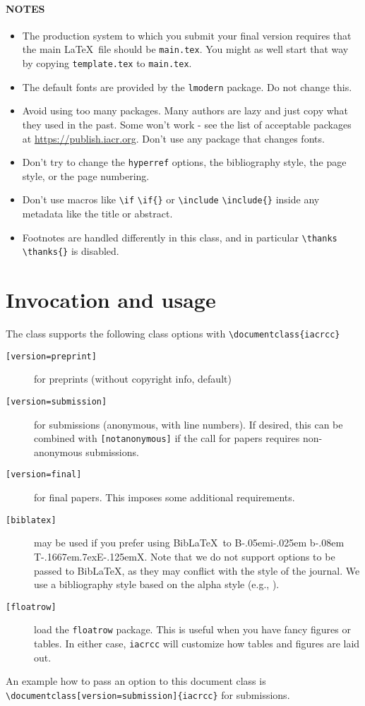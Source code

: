 \documentclass{iacrcc}
\newcommand{\cmd}[2][]{%
  \def\FirstArg{#1}
  \ifx\FirstArg\empty
    \texttt{\textbackslash{}#2}%
  \else
    \texttt{\textbackslash{}#2\{#1\}}%
  \fi
}
\def\BibTeX{{\rm B\kern-.05em{\sc i\kern-.025em b}\kern-.08em
    T\kern-.1667em\lower.7ex\hbox{E}\kern-.125emX}}
\def\BibLaTeX{Bib\LaTeX}
\begin{document}
\paragraph*{NOTES}
\begin{itemize}
\item The production system to which you submit your final version requires
  that the main \LaTeX\ file should be \texttt{main.tex}. You might as
  well start that way by copying \texttt{template.tex} to \texttt{main.tex}.
\item The default fonts are provided by the \verb+lmodern+ package. Do not
  change this.
\item Avoid using too many packages. Many authors are lazy and just
  copy what they used in the past. Some won't work - see the list of
  acceptable packages at \url{https://publish.iacr.org}. Don't use any
  package that changes fonts.
\item Don't try to change the \texttt{hyperref} options, the bibliography style,
  the page style, or the page numbering.
\item Don't use macros like \cmd{if} or \cmd{include} inside any
  metadata like the title or abstract.
\item Footnotes are handled differently in this class, and in
  particular \cmd{thanks} is disabled.
\end{itemize}

\section{Invocation and usage}

The class supports the following class options with \verb+\documentclass{iacrcc}+
\begin{description}
\item[\texttt{[version=preprint]}] for preprints (without copyright info, default)
\item[\texttt{[version=submission]}] for submissions (anonymous, with
  line numbers).  If desired, this can be combined with
  \texttt{[notanonymous]} if the call for papers requires
  non-anonymous submissions.
\item[\texttt{[version=final]}] for final papers. This imposes some
  additional requirements.
\item[\texttt{[biblatex]}] may be used if you prefer using
  \BibLaTeX\ to \BibTeX. Note that we do not support options to be
  passed to \BibLaTeX, as they may conflict with the style of the journal. We use
  a bibliography style based on the alpha style (e.g., \cite{RSA78}).
\item[\texttt{[floatrow]}] load the \texttt{floatrow} package. This is useful
  when you have fancy figures or tables. In either case, \texttt{iacrcc}
  will customize how tables and figures are laid out.
\end{description}
An example how to pass an option to this document class is
\sloppy\verb+\documentclass[version=submission]{iacrcc}+
for submissions.
\end{document}
